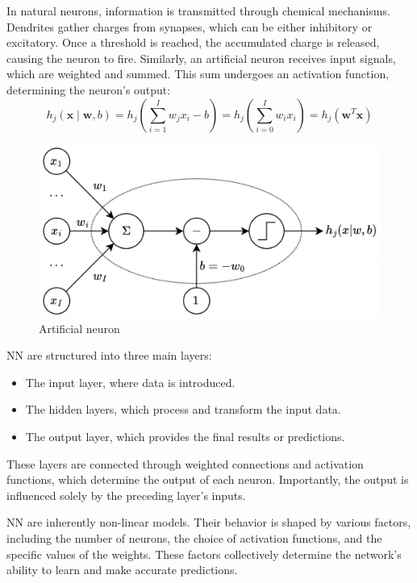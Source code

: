 In natural neurons, information is transmitted through chemical mechanisms. 
Dendrites gather charges from synapses, which can be either inhibitory or excitatory. 
Once a threshold is reached, the accumulated charge is released, causing the neuron to fire. 
Similarly, an artificial neuron receives input signals, which are weighted and summed. 
This sum undergoes an activation function, determining the neuron's output:
\[h_j(\mathbf{x}\mid \mathbf{w},b)=h_j\left(\sum_{i=1}^{I}w_j x_i-b\right)=h_j\left( \sum_{i=0}^{I}w_i x_i \right)=h_j\left(\mathbf{w}^T \mathbf{x}\right)\]
\begin{figure}[H]
    \centering
    \includegraphics[width=0.5\linewidth]{images/neuron.png}
    \caption{Artificial neuron}
\end{figure}
NN are structured into three main layers:
\begin{itemize}
    \item The input layer, where data is introduced.
    \item The hidden layers, which process and transform the input data.
    \item The output layer, which provides the final results or predictions.
\end{itemize}
These layers are connected through weighted connections and activation functions, which determine the output of each neuron. 
Importantly, the output is influenced solely by the preceding layer's inputs.

NN are inherently non-linear models. 
Their behavior is shaped by various factors, including the number of neurons, the choice of activation functions, and the specific values of the weights.
These factors collectively determine the network's ability to learn and make accurate predictions.

